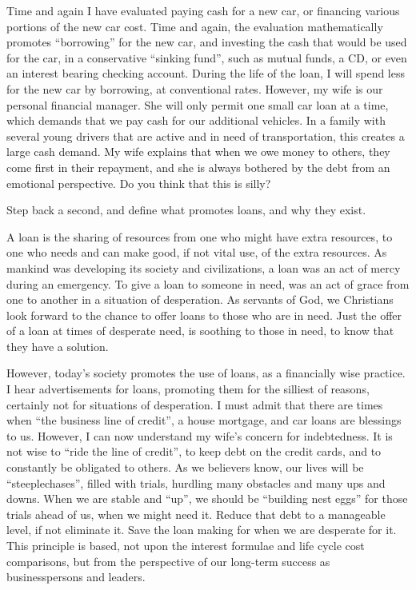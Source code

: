\documentclass[12pt]{memoir}
\begin{document}
Time and again I have evaluated paying cash for a new car, or financing
various portions of the new car cost. Time and again, the evaluation
mathematically promotes ``borrowing'' for the new car, and investing
the cash that would be used for the car, in a conservative ``sinking
fund'', such as mutual funds, a CD, or even an interest bearing checking
account. During the life of the loan, I will spend less for the new
car by borrowing, at conventional rates. However, my wife is our personal
financial manager. She will only permit one small car loan at a time,
which demands that we pay cash for our additional vehicles. In a family
with several young drivers that are active and in need of transportation,
this creates a large cash demand. My wife explains that when we owe
money to others, they come first in their repayment, and she is always
bothered by the debt from an emotional perspective. Do you think that
this is silly?

Step back a second, and define what promotes loans, and why they exist. 

A loan is the sharing of resources from one who might have extra resources,
to one who needs and can make good, if not vital use, of the extra
resources. As mankind was developing its society and civilizations,
a loan was an act of mercy during an emergency. To give a loan to
someone in need, was an act of grace from one to another in a situation
of desperation. As servants of God, we Christians look forward to
the chance to offer loans to those who are in need. Just the offer
of a loan at times of desperate need, is soothing to those in need,
to know that they have a solution.

However, today's society promotes the use of loans, as a financially
wise practice. I hear advertisements for loans, promoting them for
the silliest of reasons, certainly not for situations of desperation.
I must admit that there are times when ``the business line of credit'',
a house mortgage, and car loans are blessings to us. However, I can
now understand my wife's concern for indebtedness. It is not wise
to ``ride the line of credit'', to keep debt on the credit cards,
and to constantly be obligated to others. As we believers know, our
lives will be ``steeplechases'', filled with trials, hurdling many
obstacles and many ups and downs. When we are stable and ``up'',
we should be ``building nest eggs'' for those trials ahead of us,
when we might need it. Reduce that debt to a manageable level, if
not eliminate it. Save the loan making for when we are desperate for
it. This principle is based, not upon the interest formulae and life
cycle cost comparisons, but from the perspective of our long-term
success as businesspersons and leaders.
\end{document}
